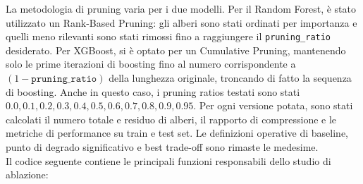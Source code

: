 \documentclass[a4paper,12pt]{report}
\begin{document}
	La metodologia di pruning varia per i due modelli. Per il Random Forest, è stato utilizzato un Rank-Based Pruning: gli alberi sono stati ordinati per importanza e quelli meno rilevanti sono stati rimossi fino a raggiungere il \texttt{pruning\_ratio} desiderato. Per XGBoost, si è optato per un Cumulative Pruning, mantenendo solo le prime iterazioni di boosting fino al numero corrispondente a \((1 - \texttt{pruning\_ratio})\) della lunghezza originale, troncando di fatto la sequenza di boosting. Anche in questo caso, i pruning ratios testati sono stati ${0.0,0.1,0.2,0.3,0.4,0.5,0.6,0.7,0.8,0.9,0.95}$. Per ogni versione potata, sono stati calcolati il numero totale e residuo di alberi, il rapporto di compressione e le metriche di performance su train e test set. Le definizioni operative di baseline, punto di degrado significativo e best trade-off sono rimaste le medesime. \\
	Il codice seguente contiene le principali funzioni responsabili dello studio di ablazione:
\end{document}
